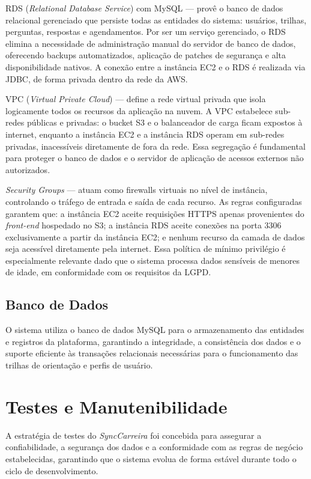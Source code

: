 RDS (\textit{Relational Database Service}) com MySQL — provê o banco de dados relacional gerenciado que persiste todas as entidades do sistema: usuários, trilhas, perguntas, respostas e agendamentos. Por ser um serviço gerenciado, o RDS elimina a necessidade de administração manual do servidor de banco de dados, oferecendo backups automatizados, aplicação de patches de segurança e alta disponibilidade nativos. A conexão entre a instância EC2 e o RDS é realizada via JDBC, de forma privada dentro da rede da AWS.

VPC (\textit{Virtual Private Cloud}) — define a rede virtual privada que isola logicamente todos os recursos da aplicação na nuvem. A VPC estabelece sub-redes públicas e privadas: o bucket S3 e o balanceador de carga ficam expostos à internet, enquanto a instância EC2 e a instância RDS operam em sub-redes privadas, inacessíveis diretamente de fora da rede. Essa segregação é fundamental para proteger o banco de dados e o servidor de aplicação de acessos externos não autorizados.

\textit{Security Groups} — atuam como firewalls virtuais no nível de instância, controlando o tráfego de entrada e saída de cada recurso. As regras configuradas garantem que: a instância EC2 aceite requisições HTTPS apenas provenientes do \textit{front-end} hospedado no S3; a instância RDS aceite conexões na porta 3306 exclusivamente a partir da instância EC2; e nenhum recurso da camada de dados seja acessível diretamente pela internet. Essa política de mínimo privilégio é especialmente relevante dado que o sistema processa dados sensíveis de menores de idade, em conformidade com os requisitos da LGPD.

\subsection{Banco de Dados}

O sistema utiliza o banco de dados MySQL para o armazenamento das entidades e registros da plataforma, garantindo a integridade, a consistência dos dados e o suporte eficiente às transações relacionais necessárias para o funcionamento das trilhas de orientação e perfis de usuário.

\section{Testes e Manutenibilidade}

A estratégia de testes do \textit{SyncCarreira} foi concebida para assegurar a confiabilidade, a segurança dos dados e a conformidade com as regras de negócio estabelecidas, garantindo que o sistema evolua de forma estável durante todo o ciclo de desenvolvimento.


